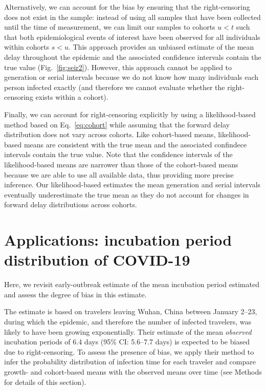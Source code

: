 \documentclass[12pt]{article}
\newcommand{\eref}[1]{Eq.~\ref{eq:#1}}
\newcommand{\fref}[1]{Fig.~\ref{fig:#1}}
\begin{document}
Alternatively, we can account for the bias by ensuring that the right-censoring does not exist in the sample:
instead of using all samples that have been collected until the time of measurement, we can limit our samples to cohorts $u < t$ such that both epidemiological events of interest have been observed for all individuals within cohorts $s < u$.
This approach provides an unbiased estimate of the mean delay throughout the epidemic and the associated confidence intervals contain the true value (\fref{seir2}).
However, this approach cannot be applied to generation or serial intervals because we do not know how many individuals each person infected exactly (and therefore we cannot evaluate whether the right-censoring exists within a cohort).

Finally, we can account for right-censoring explicitly by using a likelihood-based method based on \eref{cohort} while assuming that the forward delay distribution does not vary across cohorts.
Like cohort-based means, likelihood-based means are consistent with the true mean and the associated confindece intervals contain the true value.
Note that the confidence intervals of the likelihood-based means are narrower than those of the cohort-based means because we are able to use all available data, thus providing more precise inference.
Our likelihood-based estimates the mean generation and serial intervals eventually underestimate the true mean as they do not account for changes in forward delay distributions across cohorts.

\section{Applications: incubation period distribution of COVID-19}

Here, we revisit early-outbreak estimate of the mean incubation period estimated and assess the degree of bias in this estimate.
\cite{backer2020incubation} 

The estimate is based on travelers leaving Wuhan, China between January 2--23, during which the epidemic, and therefore the number of infected travelers, was likely to have been growing exponentially.
Their estimate of the mean \emph{observed} incubation periods of 6.4 days (95\% CI: 5.6–7.7 days) is expected to be biased due to right-censoring.
To assess the presence of bias, we apply their method to infer the probability distribution of infection time for each traveler and compare growth- and cohort-based means with the observed means over time (see Methods for details of this section).
\end{document}
